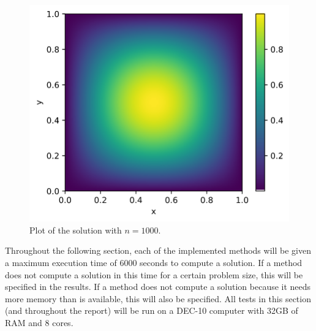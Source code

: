 \documentclass[11pt]{article}
\numberwithin{equation}{section}
\begin{document}
\begin{figure}[H]
\includegraphics[scale=.5]{img/solution2.png}
\centering
\caption{Plot of the solution with $n=1000$.}
\label{fig:solution}
\end{figure} 

Throughout the following section, each of the implemented methods will be given a maximum execution time of 6000 seconds to compute a solution. If a method does not compute a solution in this time for a certain problem size, this will be specified in the results. If a method does not compute a solution because it needs more memory than is available, this will also be specified. All tests in this section (and throughout the report) will be run on a DEC-10 computer with 32GB of RAM and 8 cores. 
\end{document}
